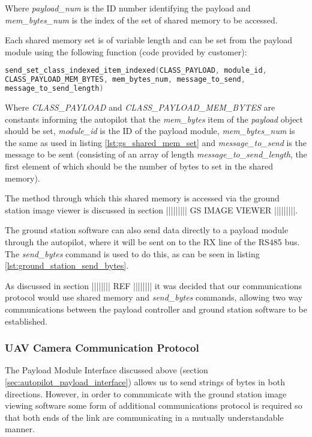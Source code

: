 Where \emph{payload\_num} is the ID number identifying the payload and 
\emph{mem\_bytes\_num} is the index of the set of shared memory to be accessed.

Each shared memory set is of variable length and can be set from the payload 
module using the following function (code provided by customer):
~\\
\begin{lstlisting}[language=C, caption={Setting shared memory from payload module}, label=lst:payload_shared_mem_set]
send_set_class_indexed_item_indexed(CLASS_PAYLOAD, module_id, 
CLASS_PAYLOAD_MEM_BYTES, mem_bytes_num, message_to_send,
message_to_send_length)
\end{lstlisting}

Where \emph{CLASS\_PAYLOAD} and \emph{CLASS\_PAYLOAD\_MEM\_BYTES} are constants 
informing the autopilot that the \emph{mem\_bytes} item of the \emph{payload} 
object should be set, \emph{module\_id} is the ID of the payload module,
\emph{mem\_bytes\_num} is the same as used in listing
\ref{lst:gs_shared_mem_set} and \emph{message\_to\_send} is the message to be 
sent (consisting of an array of length \emph{message\_to\_send\_length}, the 
first element of which should be the number of bytes to set in the shared 
memory).

The method through which this shared memory is accessed via the ground station
image viewer is discussed in section ||||||||| GS IMAGE VIEWER |||||||||.

The ground station software can also send data directly to a payload module 
through the autopilot, where it will be sent on to the RX line of the RS485
bus. The \emph{send\_bytes} command is used to do this, as can be seen in 
listing \ref{lst:ground_station_send_bytes}. 

As discussed in section |||||||| REF |||||||| it was decided that 
our communications protocol would use shared memory and \emph{send\_bytes} 
commands, allowing two way communications between the payload controller and 
ground station software to be established.

\subsubsection{UAV Camera Communication Protocol}
The Payload Module Interface discussed above (section \ref{sec:autopilot_payload_interface})
allows us to send strings of bytes in both directions. However, in order to 
communicate with the ground station image viewing software some form of 
additional communications protocol is required so that both ends of the link 
are communicating in a mutually understandable manner.

